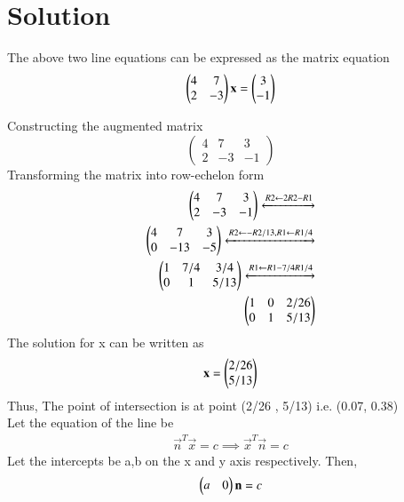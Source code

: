\documentclass[journal,12pt,twocolumn]{IEEEtran}
\begin{document}
    \section{Solution}
    The above two line equations can be expressed as the matrix equation
    \begin{align}
    \begin{pmatrix}4 & 7\\2 & -3 \end{pmatrix}\textbf{x} = \begin{pmatrix}3\\-1 \end{pmatrix}
    \end{align}
    \begin{flushleft}
    Constructing the augmented matrix \\
    $$
    \begin{pmatrix}
        4 & 7 & 3 \\ 
        2 & -3 & -1
    \end{pmatrix}
    $$
    Transforming the matrix into row-echelon form \\
    \begin{align}
    \begin{pmatrix}
    4 & 7 & 3 \\
    2 & -3 & -1
    \end{pmatrix}
      \xleftrightarrow[]{R2 \leftarrow 2R2 - R1 } \nonumber \\
    \begin{pmatrix}
    4 & 7 & 3 \\
    0 & -13 & -5
    \end{pmatrix}
    \xleftrightarrow[]{R2 \leftarrow -R2/13,R1 \leftarrow R1/4} \nonumber \\
    \begin{pmatrix}
    1 & 7/4 & 3/4 \\
    0 & 1 & 5/13
    \end{pmatrix}
    \xleftrightarrow[]{R1 \leftarrow R1-7/4R1/4} \nonumber \\
    \begin{pmatrix}
    1 & 0 & 2/26 \\
    0 & 1 & 5/13
    \end{pmatrix}
    \end{align}
    The solution for x can be written as 
    \begin{equation}
    \label{expk}
    \mathbf{x} = \begin{pmatrix}2/26 \\ 5/13\end{pmatrix}
    \end{equation}
    Thus, The point of intersection is at point (2/26 , 5/13) i.e. (0.07, 0.38)\\
    Let the equation of the line be
    \begin{align}
    \label{equ}
    \vec{n}^T\vec{x} = c \implies \vec{x}^T\vec{n} = c
    \end{align}
    Let the intercepts be a,b on the x and y axis respectively. Then,
    \begin{align} 
    \begin{pmatrix}a & 0\end{pmatrix}\mathbf{n} = c
    \end{align}
    \\

\end{flushleft}
\end{document}
